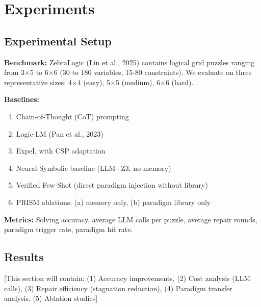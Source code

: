 
\section{Experiments}

\subsection{Experimental Setup}

\textbf{Benchmark:} ZebraLogic (Lin et al., 2025) contains logical grid puzzles ranging from 3$\times$5 to 6$\times$6 (30 to 180 variables, 15-80 constraints). We evaluate on three representative sizes: 4$\times$4 (easy), 5$\times$5 (medium), 6$\times$6 (hard).

\textbf{Baselines:}
\begin{enumerate}
    \item Chain-of-Thought (CoT) prompting
    \item Logic-LM (Pan et al., 2023)
    \item ExpeL with CSP adaptation
    \item Neural-Symbolic baseline (LLM+Z3, no memory)
    \item Verified Few-Shot (direct paradigm injection without library)
    \item PRISM ablations: (a) memory only, (b) paradigm library only
\end{enumerate}

\textbf{Metrics:} Solving accuracy, average LLM calls per puzzle, average repair rounds, paradigm trigger rate, paradigm hit rate.

\subsection{Results}

[This section will contain: (1) Accuracy improvements, (2) Cost analysis (LLM calls), (3) Repair efficiency (stagnation reduction), (4) Paradigm transfer analysis, (5) Ablation studies]
